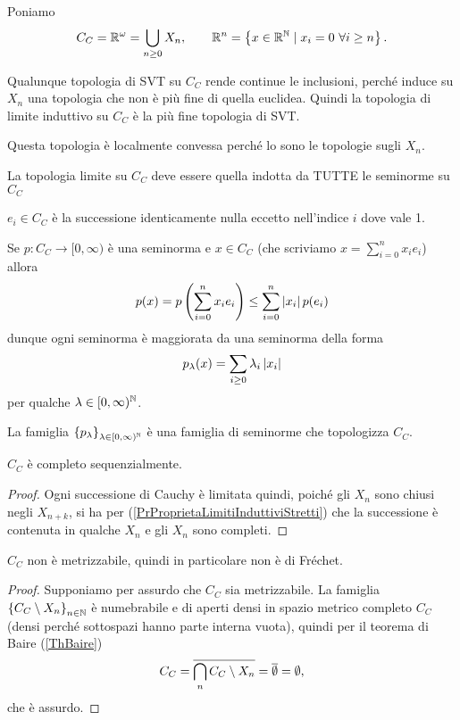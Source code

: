Poniamo
\[C_C=\mathbb{R}^\omega=\bigcup_{n\geq 0}X_n,\qquad \mathbb{R}^n=\left\{{x\in\mathbb{R}^{\mathbb{N}}\mid x_i=0\ \forall i\geq n}\right\}.\]

\begin{remark}
Qualunque topologia di SVT su $C_C$ rende continue le inclusioni, perch\'e induce su $X_n$ una topologia che non \`e pi\`u fine di quella euclidea. Quindi la topologia di limite induttivo su $C_C$ \`e la pi\`u fine topologia di SVT.
\end{remark}


\begin{remark}
Questa topologia \`e localmente convessa perch\'e lo sono le topologie sugli $X_n$.
\end{remark}

\begin{remark}
La topologia limite su $C_C$ deve essere quella indotta da TUTTE le seminorme su $C_C$
\end{remark}

\begin{notation}
$e_i\in C_C$ \`e la successione identicamente nulla eccetto nell'indice $i$ dove vale 1.
\end{notation}
\begin{remark}
Se $p:C_C\to [0,\infty)$ \`e una seminorma e $x\in C_C$ (che scriviamo $x=\sum_{i=0}^n x_i e_i$) allora
\[p(x)=p\left({\sum_{i=0}^n x_i e_i}\right)\leq \sum_{i=0}^n \left|{x_i}\right| p(e_i)\]
dunque ogni seminorma \`e maggiorata da una seminorma della forma
\[p_\lambda(x)=\sum_{i\geq 0}\lambda_i\left|{x_i}\right|\]
per qualche $\lambda\in [0,\infty)^{\mathbb{N}}$.
\end{remark}
\begin{corollary}
La famiglia $\left\{{p_\lambda}\right\}_{\lambda\in [0,\infty)^{\mathbb{N}}}$ \`e una famiglia di seminorme che topologizza $C_C$.
\end{corollary}


\begin{remark}
$C_C$ \`e completo sequenzialmente.
\end{remark}
\begin{proof}
Ogni successione di Cauchy \`e limitata quindi, poich\'e gli $X_n$ sono chiusi negli $X_{n+k}$, si ha per (\ref{PrProprietaLimitiInduttiviStretti}) che la successione \`e contenuta in qualche $X_n$ e gli $X_n$ sono completi. 
\end{proof}

\begin{remark}
$C_C$ non \`e metrizzabile, quindi in particolare non \`e di Fr\'echet.
\end{remark}
\begin{proof}
Supponiamo per assurdo che $C_C$ sia metrizzabile.
La famiglia $\left\{{C_C\setminus X_n}\right\}_{n\in\mathbb{N}}$ \`e numebrabile e di aperti densi in spazio metrico completo $C_C$ (densi perch\'e sottospazi hanno parte interna vuota), quindi  per il teorema di Baire (\ref{ThBaire}) 
\[C_C=\overline{\bigcap_n C_C\setminus X_n}=\overline{\emptyset}=\emptyset,\]
che \`e assurdo.
\end{proof}


